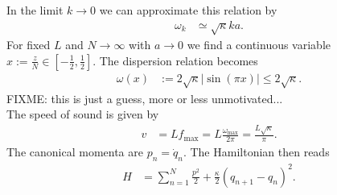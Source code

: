 \documentclass[english, parskip=full]{scrartcl}
\newcommand{\klam}{}
\newcommand{\tecxt}{}
\begin{document}
In the limit $k\rightarrow 0$ we can approximate this relation by
\begin{align}
\omega_k&\simeq \sqrt{\kappa}ka.
\end{align}
For fixed $L$ and $N\rightarrow\infty$ with $a\rightarrow 0$ we find a continuous variable $x:=\frac{z}{N}\in \klam\left[ {-\frac{1}{2},\frac{1}{2}} \right]$.
The dispersion relation becomes
\begin{align*}
\omega (x) &:=2\sqrt{\kappa}\left\vert\sin (\pi x)\right\vert\le 2\sqrt{\kappa}.
\end{align*}
FIXME: this is just a guess, more or less unmotivated...\\
The speed of sound is given by 
\begin{align}
v&=Lf_\tecxt\text{max}=L\frac{\omega_\tecxt\text{max}}{2\pi}=\frac{L\sqrt{\kappa}}{\pi}.
\end{align}
The canonical momenta are $p_n=\dot{q}_n$.
The Hamiltonian then reads
\begin{align}
H&=\sum_{n=1}^N\frac{p^2}{2}+\frac{\kappa}{2}(q_{n+1}-q_n)^2.
\end{align}
\end{document}
